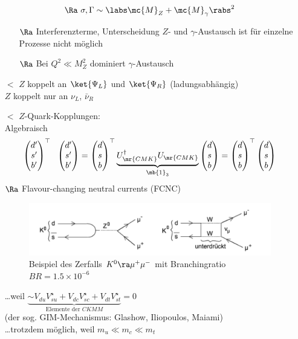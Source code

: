 \begin{itemize}
\begin{align*}
\Ra \ \sigma, \Gamma \sim \labs \mc{M}_Z + \mc{M}_\gamma \rabs^2
\end{align*}
\begin{itemize}
\item[$\Ra$] Interferenzterme, Unterscheidung $Z$- und $\gamma$-Austausch ist für einzelne Prozesse nicht möglich
\item[$\Ra$] Bei $Q^2 \ll M_Z^2$ dominiert $\gamma$-Austausch
\end{itemize}
\item[$\lt$] $Z$ koppelt an $\ket{\Psi_L}$ und $\ket{\Psi_R}$ (ladungsabhängig)\\
$Z$ koppelt nur an $\nu_L$, $\bar{\nu}_R$
\item[$\lt$] $Z$-Quark-Kopplungen:\\
\glqq Algebraisch\grqq{}
\begin{align*}
\begin{pmatrix}
d^\prime\\ s^\prime \\ b^\prime
\end{pmatrix}^\top \ \ \begin{pmatrix}
d^\prime \\ s^\prime \\ b^\prime
\end{pmatrix} = \begin{pmatrix}
d\\ s\\ b\end{pmatrix}^\top \underbrace{U_\mr{CMK}^\dagger U_\mr{CMK}}_{\mb{1}_3} \begin{pmatrix}
d \\ s\\ b
\end{pmatrix} = \begin{pmatrix}
d \\ s \\ b 
\end{pmatrix}^\top \begin{pmatrix}
d \\ s\\ b
\end{pmatrix}
\end{align*}
$\Ra$  \glqq Flavour-changing neutral currents\grqq{} (FCNC)

\begin{figure}[!ht]
\centering
\includegraphics[width=.5\textwidth]{imgs/ep5-fig-8-15.pdf}
\caption{Beispiel des Zerfalls $K^0 \ra \mu^+ \mu^-$ mit Branchingratio $BR=1.5\times 10^{-6}$ \label{fig:8.15}}
\end{figure}

\dots weil $\underbrace{\sim V_{du} V_{su}^\star + V_{dc}V_{sc}^\star + V_{dt}V_{st}^\star}_\text{Elemente der $CKMM$} =0$\\
(der sog. GIM-Mechanismus: Glashow, Iliopoulos, Maiami)\\
\dots trotzdem möglich, weil $m_u \ll m_c \ll m_t$
\end{itemize}

